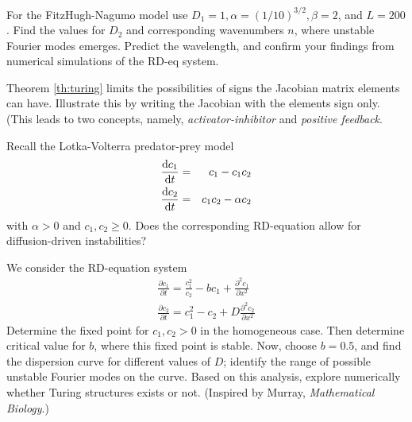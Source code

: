 \begin{exerciseregion}
	\begin{exercise}
		For the FitzHugh-Nagumo model use $D_1=1, \alpha=(1/10)^{3/2}, \beta=2$, and $L=200$. 
		Find the values for $D_2$ and corresponding wavenumbers $n$, where unstable Fourier modes emerges. 
		Predict the wavelength, and confirm your findings from numerical simulations of the RD-eq system.
	\end{exercise}
	\begin{exercise}
		Theorem \ref{th:turing} limits the possibilities of signs the Jacobian matrix elements can have. Illustrate 
		this by writing the Jacobian with the elements sign only. (This leads to two concepts, namely, 
		\emph{activator-inhibitor} and \emph{positive feedback}. 
	\end{exercise}
	\begin{exercise}
		Recall the Lotka-Volterra predator-prey model 
		\begin{eqnarray}
			\frac{\mathrm{d} c_1}{\mathrm{d} t} &=& c_1 - c_1c_2 \nonumber \\
			\frac{\mathrm{d} c_2}{\mathrm{d} t} &=& c_1c_2 - \alpha c_2
		\end{eqnarray}
		with $\alpha>0$ and $c_1,c_2 \geq 0$. 
		Does the corresponding RD-equation allow for diffusion-driven instabilities?
	\end{exercise}
	\begin{exploration}
		We consider the RD-equation system
		\begin{eqnarray}
			\frac{\partial c_1}{\partial t} = \frac{c_1^2}{c_2} - b c_1 + \frac{\partial^2 c_1}{\partial x^2} \\
			\frac{\partial c_2}{\partial t} = c_1^2 - c_2 + D \frac{\partial^2 c_2}{\partial x^2}
		\end{eqnarray}
		Determine the fixed point for $c_1, c_2 > 0$ in the homogeneous case. 
		Then determine critical value for $b$, where this fixed point is stable. 
		Now, choose $b=0.5$, and find the dispersion curve for different values of $D$; identify the range of 
		possible unstable Fourier modes on the curve. Based on this analysis, explore numerically 
		whether Turing structures 
		exists or not. (Inspired by Murray, \textit{Mathematical Biology}.) 
	\end{exploration}
	
\end{exerciseregion}





